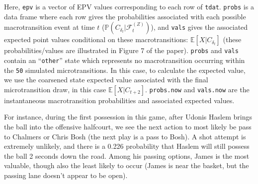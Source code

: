 \documentclass{article}\usepackage[]{graphicx}\usepackage[]{color}
\begin{document}
Here, \texttt{epv} is a vector of EPV values corresponding to each row of \texttt{tdat}. \texttt{probs} is a data frame where each row gives the probabilities associated with each possible macrotransition event at time $t$ ($\mathbb{P}(C_{\delta_t} | \mathcal{F}^{(Z)}_t)$), and \texttt{vals} gives the associated expected point values conditional on these macrotransitions: $\mathbb{E}[X | C_{\delta_t}]$ (these probabilities/values are illustrated in Figure 7 of the paper). \texttt{probs} and \texttt{vals} contain an ``\texttt{other}'' state which represents no macrotransition occurring within the \texttt{50} simulated microtransitions. In this case, to calculate the expected value, we use the coarsened state expected value associated with the final microtransition draw, in this case $\mathbb{E}[X | C_{t + 2}]$. \texttt{probs.now} and \texttt{vals.now} are the instantaneous macrotransition probabilities and associated expected values. 

For instance, during the first possession in this game, after Udonis Haslem brings the ball into the offensive halfcourt, we see the next action to most likely be  pass to Chalmers or Chris Bosh (the next play is a pass to Bosh). A shot attempt is extremely unlikely, and there is a 0.226 probability that Haslem will still possess the ball 2 seconds down the road. Among his passing options, James is the most valuable, though also the least likely to occur (James is near the basket, but the passing lane doesn't appear to be open). 
\end{document}
